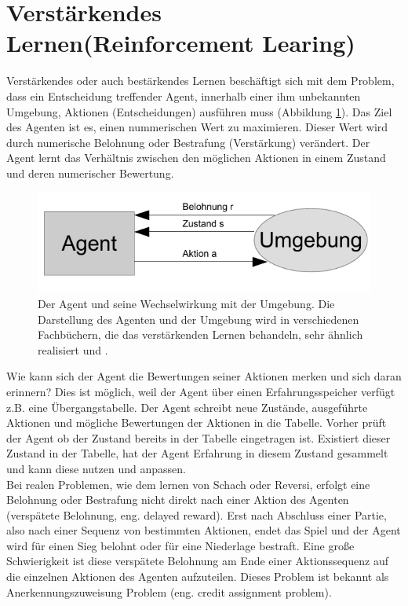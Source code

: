 \section{Verstärkendes Lernen(Reinforcement Learing)}
\label{sec:Verstärkendes Lernen}
Verstärkendes oder auch bestärkendes Lernen beschäftigt sich mit dem Problem, dass ein Entscheidung treffender Agent, innerhalb einer ihm unbekannten Umgebung, Aktionen (Entscheidungen) ausführen muss (Abbildung \ref{fig:agent_umgebung}). Das Ziel des Agenten ist es, einen nummerischen Wert zu maximieren. Dieser Wert wird durch numerische Belohnung oder Bestrafung (Verstärkung) verändert. Der Agent lernt das Verhältnis zwischen den möglichen Aktionen in einem Zustand und deren numerischer Bewertung. \\

\begin{figure}[!htbp]
  \centering
  \includegraphics[scale = 1.4]{inhalt/abbildungen/agent_umgebung.pdf}
  \caption{Der Agent und seine Wechselwirkung mit der Umgebung. Die Darstellung des Agenten und der Umgebung wird in verschiedenen Fachbüchern, die das  verstärkenden Lernen behandeln, sehr ähnlich realisiert \cite[398]{Alpaydin} und \cite[290]{Ertel}.}
  \label{fig:agent_umgebung}
\end{figure} 

Wie kann sich der Agent die Bewertungen seiner Aktionen merken und sich daran erinnern? Dies ist möglich, weil der Agent über einen Erfahrungsspeicher verfügt z.B. eine Übergangstabelle. Der Agent schreibt neue Zustände, ausgeführte Aktionen und mögliche Bewertungen der Aktionen in die Tabelle. Vorher prüft der Agent ob der Zustand bereits in der Tabelle eingetragen ist. Existiert dieser Zustand in der Tabelle, hat der Agent Erfahrung in diesem Zustand gesammelt und kann diese nutzen und anpassen. \\
 
Bei realen Problemen, wie dem lernen von Schach oder Reversi, erfolgt eine Belohnung oder Bestrafung nicht direkt nach einer Aktion des Agenten (verspätete Belohnung, eng. delayed reward). Erst nach Abschluss einer Partie, also nach einer Sequenz von bestimmten Aktionen, endet das Spiel und der Agent wird für einen Sieg belohnt oder für eine Niederlage bestraft. Eine große Schwierigkeit ist diese verspätete Belohnung am Ende einer Aktionssequenz auf die einzelnen Aktionen des Agenten aufzuteilen. Dieses Problem ist bekannt als Anerkennungszuweisung Problem (eng. credit assignment problem). \\


